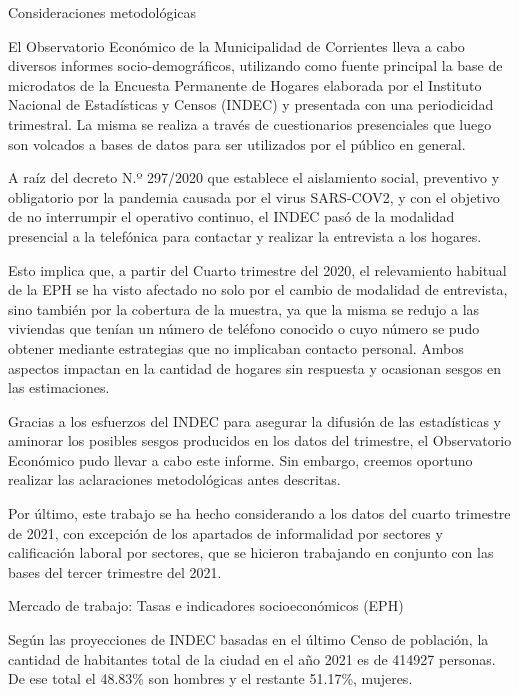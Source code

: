 \documentclass[
]{article}
\author{}
\date{\vspace{-2.5em}}
\begin{document}
\textcolor{graycustom}{\Large Consideraciones metodológicas} \newline

El Observatorio Económico de la Municipalidad de Corrientes lleva a cabo
diversos informes socio-demográficos, utilizando como fuente principal
la base de microdatos de la Encuesta Permanente de Hogares elaborada por
el Instituto Nacional de Estadísticas y Censos (INDEC) y presentada con
una periodicidad trimestral. La misma se realiza a través de
cuestionarios presenciales que luego son volcados a bases de datos para
ser utilizados por el público en general.

A raíz del decreto N.º 297/2020 que establece el aislamiento social,
preventivo y obligatorio por la pandemia causada por el virus SARS-COV2,
y con el objetivo de no interrumpir el operativo continuo, el INDEC pasó
de la modalidad presencial a la telefónica para contactar y realizar la
entrevista a los hogares.

Esto implica que, a partir del Cuarto trimestre del 2020, el
relevamiento habitual de la EPH se ha visto afectado no solo por el
cambio de modalidad de entrevista, sino también por la cobertura de la
muestra, ya que la misma se redujo a las viviendas que tenían un número
de teléfono conocido o cuyo número se pudo obtener mediante estrategias
que no implicaban contacto personal. Ambos aspectos impactan en la
cantidad de hogares sin respuesta y ocasionan sesgos en las
estimaciones.

Gracias a los esfuerzos del INDEC para asegurar la difusión de las
estadísticas y aminorar los posibles sesgos producidos en los datos del
trimestre, el Observatorio Económico pudo llevar a cabo este informe.
Sin embargo, creemos oportuno realizar las aclaraciones metodológicas
antes descritas.

Por último, este trabajo se ha hecho considerando a los datos del cuarto
trimestre de 2021, con excepción de los apartados de informalidad por
sectores y calificación laboral por sectores, que se hicieron trabajando
en conjunto con las bases del tercer trimestre del 2021.

\newpage

\textcolor{graycustom}{\Large Mercado de trabajo: 
Tasas e indicadores socioeconómicos (EPH)} \newline

Según las proyecciones de INDEC basadas en el último Censo de población,
la cantidad de habitantes total de la ciudad en el año 2021 es de 414927
personas. De ese total el 48.83\% son hombres y el restante 51.17\%,
mujeres.
\end{document}
